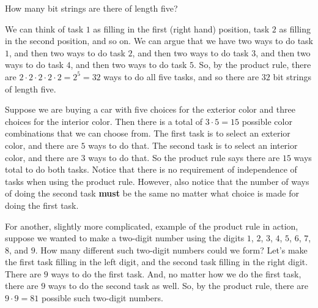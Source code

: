 \begin{exmp}
 How many bit strings are there of length five?
 \begin{soln}
 We can think of task $1$ as filling in the first (right hand) position, task $2$ as filling in the
 second position, and so on.
 We can argue that 
 we have two ways to do task $1$,
 and then two ways to do task $2$, 
 and then two  ways to do task $3$, 
 and then two ways to do task $4$, 
 and then two ways to do task $5$.
 So, by the product rule, 
 there are $2\cdot 2\cdot 2\cdot 2\cdot 2=2^5=32$ ways to do all five tasks, and so there
 are $32$  bit strings of length five.
 \end{soln}
\end{exmp}


\begin{exmp}
Suppose we are buying a car with five choices
for the exterior color and three choices for the interior color. Then there is a
total of $3\cdot5=15$ possible color combinations that we can choose from. The
first task is to select an exterior color, and there are $5$ ways to do that. The
second task is to select an interior color, and there are $3$ ways to do that. So
the product rule says there are $15$ ways total to do both tasks. Notice that
there is no requirement of independence of tasks when using the product
rule. However, also notice that the number of ways of doing the second task \textbf{must}
be the same no matter what choice is made for doing the first task.
\end{exmp}

\begin{exmp}\label{exmp:two-digit 1-9}
For another,
slightly more complicated, example of the product rule in action, suppose we
wanted to make a two-digit number using the digits $1$, $2$, $3$, $4$, $5$, $6$,
$7$, $8$, and $9$. How many different such two-digit numbers could we form? Let's
make the first task filling in the left digit, and the second task filling in the
right digit. There are $9$ ways to do the first task. And, no matter how we do
the first task, there are $9$ ways to do the second task as well. So, by the
product rule, there are $9\cdot9=81$ possible such two-digit numbers. 
\end{exmp}

